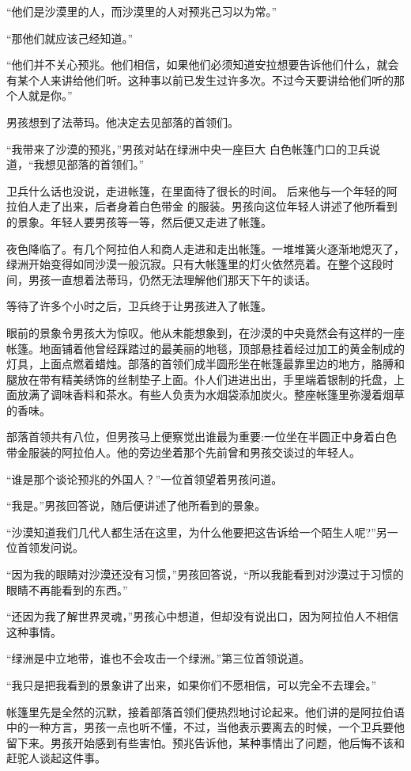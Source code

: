 \documentclass[twoside,openany]{book}
\begin{document}
“他们是沙漠里的人，而沙漠里的人对预兆己习以为常。”

“那他们就应该己经知道。”

“他们并不关心预兆。他们相信，如果他们必须知道安拉想要告诉他们什么，就会有某个人来讲给他们听。这种事以前已发生过许多次。不过今天要讲给他们听的那个人就是你。”

男孩想到了法蒂玛。他决定去见部落的首领们。

“我带来了沙漠的预兆，”男孩对站在绿洲中央一座巨大 白色帐篷门口的卫兵说道，“我想见部落的首领们。”

卫兵什么话也没说，走进帐篷，在里面待了很长的时间。 后来他与一个年轻的阿拉伯人走了出来，后者身着白色带金 的服装。男孩向这位年轻人讲述了他所看到的景象。年轻人要男孩等一等，然后便又走进了帐篷。

夜色降临了。有几个阿拉伯人和商人走进和走出帐篷。一堆堆簧火逐渐地熄灭了，绿洲开始变得如同沙漠一般沉寂。只有大帐篷里的灯火依然亮着。在整个这段时间，男孩一直想着法蒂玛，仍然无法理解他们那天下午的谈话。

等待了许多个小时之后，卫兵终于让男孩进入了帐篷。

眼前的景象令男孩大为惊叹。他从未能想象到，在沙漠的中央竟然会有这样的一座帐篷。地面铺着他曾经踩踏过的最美丽的地毯，顶部悬挂着经过加工的黄金制成的灯具，上面点燃着蜡烛。部落的首领们成半圆形坐在帐篷最靠里边的地方，胳膊和腿放在带有精美绣饰的丝制垫子上面。仆人们进进出出，手里端着银制的托盘，上面放满了调味香料和茶水。有些人负责为水烟袋添加炭火。整座帐篷里弥漫着烟草的香味。

部落首领共有八位，但男孩马上便察觉出谁最为重要:一位坐在半圆正中身着白色带金服装的阿拉伯人。他的旁边坐着那个先前曾和男孩交谈过的年轻人。

“谁是那个谈论预兆的外国人？”一位首领望着男孩问道。

“我是。”男孩回答说，随后便讲述了他所看到的景象。

“沙漠知道我们几代人都生活在这里，为什么他要把这告诉给一个陌生人呢?”另一位首领发问说。

“因为我的眼睛对沙漠还没有习惯，”男孩回答说，“所以我能看到对沙漠过于习惯的眼睛不再能看到的东西。”

“还因为我了解世界灵魂，”男孩心中想道，但却没有说出口，因为阿拉伯人不相信这种事情。

“绿洲是中立地带，谁也不会攻击一个绿洲。”第三位首领说道。

“我只是把我看到的景象讲了出来，如果你们不愿相信，可以完全不去理会。”

帐篷里先是全然的沉默，接着部落首领们便热烈地讨论起来。他们讲的是阿拉伯语中的一种方言，男孩一点也听不懂，不过，当他表示要离去的时候，一个卫兵要他留下来。男孩开始感到有些害怕。预兆告诉他，某种事情出了问题，他后悔不该和赶驼人谈起这件事。
\end{document}
